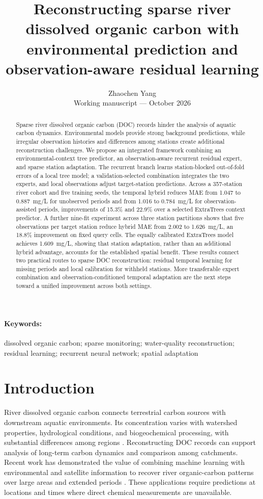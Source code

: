 \documentclass[11pt]{article}
\title{Reconstructing sparse river dissolved organic carbon with environmental prediction and observation-aware residual learning}
\author{Zhaochen Yang\\[2pt]\small Working manuscript --- October 2026}
\date{}
\begin{document}
\maketitle

\begin{abstract}
Sparse river dissolved organic carbon (DOC) records hinder the analysis of aquatic carbon dynamics. Environmental models provide strong background predictions, while irregular observation histories and differences among stations create additional reconstruction challenges. We propose an integrated framework combining an environmental-context tree predictor, an observation-aware recurrent residual expert, and sparse station adaptation. The recurrent branch learns station-blocked out-of-fold errors of a local tree model; a validation-selected combination integrates the two experts, and local observations adjust target-station predictions. Across a 357-station river cohort and five training seeds, the temporal hybrid reduces MAE from 1.047 to 0.887~mg/L for unobserved periods and from 1.016 to 0.784~mg/L for observation-assisted periods, improvements of 15.3\% and 22.9\% over a selected ExtraTrees context predictor. A further nine-fit experiment across three station partitions shows that five observations per target station reduce hybrid MAE from 2.002 to 1.626~mg/L, an 18.8\% improvement on fixed query cells. The equally calibrated ExtraTrees model achieves 1.609~mg/L, showing that station adaptation, rather than an additional hybrid advantage, accounts for the established spatial benefit. These results connect two practical routes to sparse DOC reconstruction: residual temporal learning for missing periods and local calibration for withheld stations. More transferable expert combination and observation-conditioned temporal adaptation are the next steps toward a unified improvement across both settings.
\end{abstract}
\paragraph{Keywords:} dissolved organic carbon; sparse monitoring; water-quality reconstruction; residual learning; recurrent neural network; spatial adaptation

\section{Introduction}
River dissolved organic carbon connects terrestrial carbon sources with downstream aquatic environments. Its concentration varies with watershed properties, hydrological conditions, and biogeochemical processing, with substantial differences among regions \citep{yang2017}. Reconstructing DOC records can support analysis of long-term carbon dynamics and comparison among catchments. Recent work has demonstrated the value of combining machine learning with environmental and satellite information to recover river organic-carbon patterns over large areas and extended periods \citep{tian2025}. These applications require predictions at locations and times where direct chemical measurements are unavailable.
\end{document}
